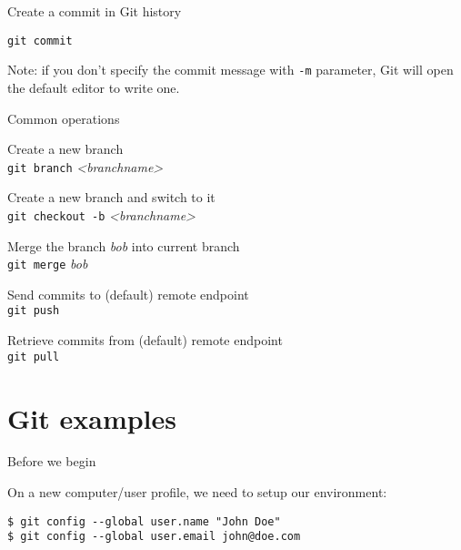 \begin{frame}[fragile]{Create a commit in Git history}

\vspace{2em}

\Large \texttt{git commit}

\vspace{2em}

Note: if you don't specify the commit message with \texttt{-m} parameter,
Git will open the default editor to write one.

\end{frame}


\begin{frame}[fragile]{Common operations}

Create a new branch \\
\texttt{git branch} \textit{<branchname>}

Create a new branch and switch to it \\
\texttt{git checkout -b} \textit{<branchname>}

Merge the branch \textit{bob} into current branch \\
\texttt{git merge} \textit{bob}

Send commits to (default) remote endpoint \\
\texttt{git push}

Retrieve commits from (default) remote endpoint \\
\texttt{git pull}

\end{frame}




\section{Git examples}

\begin{frame}[c,fragile]{Before we begin}

On a new computer/user profile, we need to setup our environment:

\begin{center}
\begin{minipage}{\textwidth}

\begin{listing}[H]
\begin{verbatim}
$ git config --global user.name "John Doe"
$ git config --global user.email john@doe.com
\end{verbatim}
\end{listing}

\end{minipage}
\end{center}

\end{frame}



